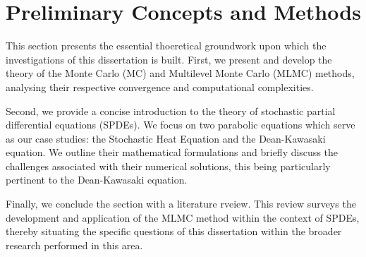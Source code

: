 \chapter{Preliminary Concepts and Methods}

This section presents the essential thoeretical groundwork upon which the
investigations of this dissertation is built. First, we present and develop the theory 
of the Monte Carlo (MC) and Multilevel Monte Carlo (MLMC) methods, analysing their 
respective convergence and computational complexities. 

Second, we provide a concise introduction to the theory of stochastic partial differential 
equations (SPDEs). We focus on two parabolic equations which serve as our case studies: 
the Stochastic Heat Equation and the Dean-Kawasaki equation. We outline 
their mathematical formulations and briefly discuss the challenges 
associated with their numerical solutions, this being particularly pertinent to 
the Dean-Kawasaki equation.

Finally, we conclude the section with a literature rveiew. This review surveys the 
development and application of the MLMC method within the context of SPDEs, 
thereby situating the specific questions of this dissertation within the broader
research performed in this area.




